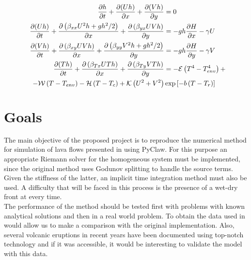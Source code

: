 \documentclass[12pt]{extarticle}
\begin{document}
\begin{align}
\frac{\partial h}{\partial t}+\frac{\partial(U h)}{\partial x}+\frac{\partial(V h)}{\partial y}&=0 \label{eq: 1}\\
\frac{\partial(U h)}{\partial t}+\frac{\partial\left(\beta_{x x} U^{2} h+g h^{2} / 2\right)}{\partial x}+\frac{\partial\left(\beta_{y x} U V h\right)}{\partial y}&=-g h \frac{\partial H}{\partial x}-\gamma U \label{eq: 2}\\
\frac{\partial(V h)}{\partial t}+\frac{\partial\left(\beta_{x y} U V h\right)}{\partial x}+\frac{\partial\left(\beta_{y y} V^{2} h+g h^{2} / 2\right)}{\partial y}&=-g h \frac{\partial H}{\partial y}-\gamma V \label{eq: 3}\\
\frac{\partial(T h)}{\partial t}+\frac{\partial\left(\beta_{T x} U T h\right)}{\partial x}+\frac{\partial\left(\beta_{T y} V T h\right)}{\partial y}&=-\mathcal{E}\left(T^{4}-T_{e n v}^{4}\right)+ \label{eq: 4}\\
\quad-\mathcal{W}\left(T-T_{e n v}\right)-\mathcal{H}\left(T-T_{c}\right)+\mathcal{K}\left(U^{2}+V^{2}\right) &\exp \left[-b\left(T-T_{r}\right)\right] \notag
\end{align}
 

\section{Goals}

The main objective of the proposed project is to reproduce the numerical method for simulation of lava flows presented in \cite{costa2005numerical} using PyClaw. For this purpose an appropriate Riemann solver for the homogeneous system must be implemented, since the original method uses Godunov splitting to handle the source terms. Given the stiffness of the latter, an implicit time integration method must also be used. A difficulty that will be faced in this process is the presence of a wet-dry front at every time. \\

The performance of the method should be tested first with problems with known analytical solutions and then in a real world problem. To obtain the data used in \cite{costa2005numerical} would allow us to make a comparison with the original implementation. Also, several volcanic eruptions in recent years have been documented using top-notch technology and if it was accessible, it would be interesting to validate the model with this data.




\end{document}
